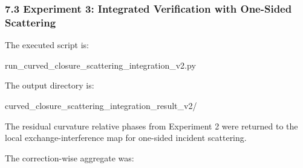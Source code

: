\documentclass[
  a4paper,
]{article}
\newenvironment{Shaded}{}{}
\newcommand{\NormalTok}[1]{#1}
\begin{document}
\subsubsection{7.3 Experiment 3: Integrated Verification with One-Sided
Scattering}\label{experiment-3-integrated-verification-with-one-sided-scattering}

The executed script is:

\begin{Shaded}
\begin{Highlighting}[]
\NormalTok{run\_curved\_closure\_scattering\_integration\_v2.py}
\end{Highlighting}
\end{Shaded}

The output directory is:

\begin{Shaded}
\begin{Highlighting}[]
\NormalTok{curved\_closure\_scattering\_integration\_result\_v2/}
\end{Highlighting}
\end{Shaded}

The residual curvature relative phases from Experiment 2 were returned
to the local exchange-interference map for one-sided incident
scattering.

The correction-wise aggregate was:
\end{document}

